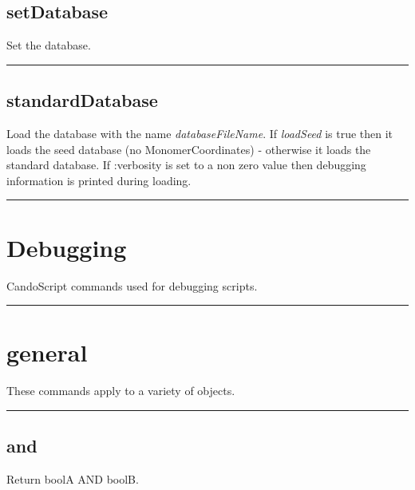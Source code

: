 \begin{itemize}
\subsection{setDatabase}

Set the database.

\rule{6in}{0.01cm}\par
{}\par
\subsection{standardDatabase}
\returns{()}

Load the database with the name \emph{databaseFileName}.
If \emph{loadSeed} is true then it loads the seed database (no MonomerCoordinates) 
- otherwise it loads the standard database.
If :verbosity is set to a non zero value then debugging information is printed during loading.

\rule{6in}{0.01cm}\par
{}\par
\section{Debugging}
CandoScript commands used for debugging scripts.

\rule{6in}{0.01cm}\par
{}\par
\section{general}
These commands apply to a variety of objects.

\rule{6in}{0.01cm}\par
{}\par
\subsection{and}
  \par

  Return boolA AND boolB.


\end{itemize}
